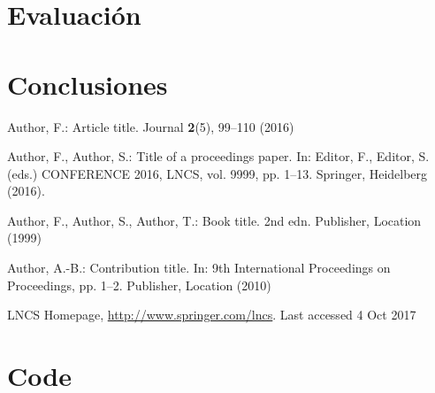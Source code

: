 \documentclass[runningheads]{llncs}
\begin{document}
\section{Evaluación}
\label{sc:eval}




\section{Conclusiones}
\label{sc:concl}


\begin{thebibliography}{8}
Author, F.: Article title. Journal \textbf{2}(5), 99--110 (2016)

Author, F., Author, S.: Title of a proceedings paper. In: Editor,
F., Editor, S. (eds.) CONFERENCE 2016, LNCS, vol. 9999, pp. 1--13.
Springer, Heidelberg (2016). 

Author, F., Author, S., Author, T.: Book title. 2nd edn. Publisher,
Location (1999)

Author, A.-B.: Contribution title. In: 9th International Proceedings
on Proceedings, pp. 1--2. Publisher, Location (2010)

LNCS Homepage, \url{http://www.springer.com/lncs}. Last accessed 4
Oct 2017
\end{thebibliography}

\newpage

\appendix
\section{Code}
\label{app:codigo-inicial}
\end{document}
